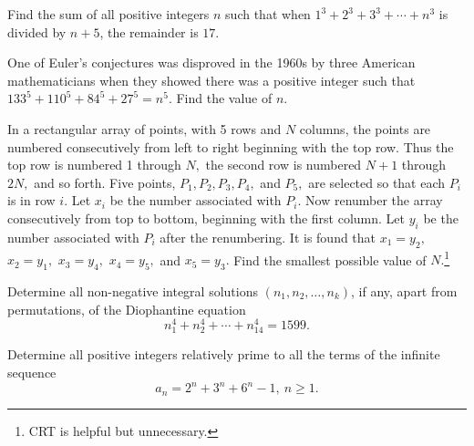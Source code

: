 \documentclass[mast]{lucky}
\begin{document}
\begin{prob}[AOIME 2020/10]{6}
Find the sum of all positive integers $n$ such that when $1^3+2^3+3^3+\cdots+n^3$ is divided by $n+5$, the remainder is $17.$
\end{prob}

\begin{req}[AIME 1989/9]{9}
One of Euler's conjectures was disproved in the 1960s by three American mathematicians when they showed there was a positive integer such that $133^5+110^5+84^5+27^5=n^{5}$. Find the value of $n$.
\end{req}

\begin{prob}[AIME I 2001/11]{9}
In a rectangular array of points, with 5 rows and $N$ columns, the points are numbered consecutively from left to right beginning with the top row. Thus the top row is numbered 1 through $N,$ the second row is numbered $N+1$ through $2N,$ and so forth. Five points, $P_1, P_2, P_3, P_4,$ and $P_5,$ are selected so that each $P_i$ is in row $i.$ Let $x_i$ be the number associated with $P_i.$ Now renumber the array consecutively from top to bottom, beginning with the first column. Let $y_i$ be the number associated with $P_i$ after the renumbering. It is found that $x_1=y_2,$ $x_2=y_1,$ $x_3=y_4,$ $x_4=y_5,$ and $x_5=y_3.$ Find the smallest possible value of $N.$\footnote{CRT is helpful but unnecessary.}
\end{prob}
    
\begin{prob}[USAMO 1979/1]{9}
Determine all non-negative integral solutions $(n_1, n_2, \dots , n_k)$, if any, apart from permutations, of the Diophantine equation
$$n_1^4 + n_2^4 + \cdots + n_{14}^{4} = 1599.$$
\end{prob}

\begin{prob}[IMO 2005/4]{13}
Determine all positive integers relatively prime to all the terms of the infinite sequence
\[a_n=2^n+3^n+6^n -1,\ n\geq 1.\]
\end{prob}
\end{document}
